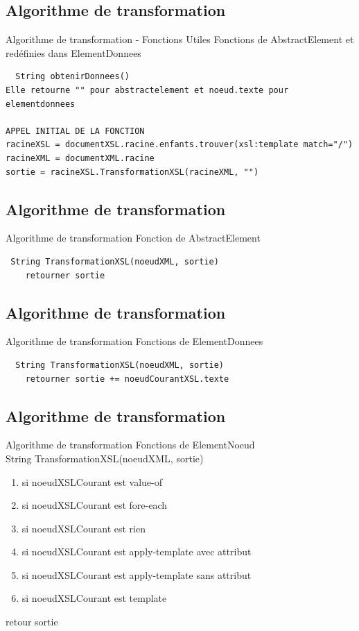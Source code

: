 \documentclass[aspectratio=169]{beamer}
\begin{document}
\subsection{Algorithme de transformation}
\begin{frame}[fragile]{Algorithme de transformation - Fonctions Utiles }
 Fonctions de AbstractElement et redéfinies dans ElementDonnees
 \scriptsize
 \begin{verbatim}
  String obtenirDonnees()
Elle retourne "" pour abstractelement et noeud.texte pour elementdonnees

APPEL INITIAL DE LA FONCTION
racineXSL = documentXSL.racine.enfants.trouver(xsl:template match="/")
racineXML = documentXML.racine
sortie = racineXSL.TransformationXSL(racineXML, "")
 \end{verbatim}
\normalsize
\end{frame}

\subsection{Algorithme de transformation}
\begin{frame}[fragile]{Algorithme de transformation}
Fonction de AbstractElement
\scriptsize
\begin{verbatim}
 String TransformationXSL(noeudXML, sortie)
    retourner sortie
\end{verbatim}
\end{frame}

\subsection{Algorithme de transformation}
\begin{frame}[fragile]{Algorithme de transformation}
 Fonctions de ElementDonnees
 \scriptsize
 \begin{verbatim}
  String TransformationXSL(noeudXML, sortie)
    retourner sortie += noeudCourantXSL.texte
 \end{verbatim}
 \normalsize
\end{frame}

\subsection{Algorithme de transformation}
\begin{frame}{Algorithme de transformation}
 Fonctions de ElementNoeud\\
 \scriptsize
String TransformationXSL(noeudXML, sortie)\\
\begin{enumerate}
 \item si noeudXSLCourant est value-of
 \item si noeudXSLCourant est fore-each
 \item si noeudXSLCourant est rien
 \item si noeudXSLCourant est apply-template avec attribut
 \item si noeudXSLCourant est apply-template sans attribut
 \item si noeudXSLCourant est template
\end{enumerate}
retour sortie
\normalsize
\end{frame}
\end{document}
